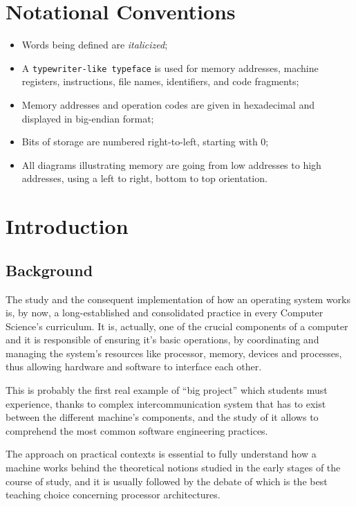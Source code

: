 \documentclass[12pt,a4paper,openright,twoside]{report}
\begin{document}
\chapter*{Notational Conventions}
\begin{itemize}
	\item Words being defined are \textit{italicized};
	\item A \texttt{typewriter-like typeface} is used for memory addresses, machine registers, instructions, file names, identifiers, and code fragments;
	\item Memory addresses and operation codes are given in hexadecimal and displayed in big-endian format;
	\item Bits of storage are numbered right-to-left, starting with 0;
	\item All diagrams illustrating memory are going from low addresses to high addresses, using a left to right, bottom to top orientation.
\end{itemize}

\clearpage{\pagestyle{empty}\cleardoublepage}
\chapter{Introduction}
\lhead[\fancyplain{}{\bfseries\thepage}]{\fancyplain{}{\bfseries\rightmark}}

\section{Background}
The study and the consequent implementation of how an operating system works is, by now, a long-established and consolidated practice in every Computer Science's curriculum.
It is, actually, one of the crucial components of a computer and it is responsible of ensuring it's basic operations, by coordinating and managing the system's resources like processor, memory, devices and processes, thus allowing hardware and software to interface each other.

This is probably the first real example of ``big project'' which students must experience, thanks to complex intercommunication system that has to exist between the different machine's components, and the study of it allows to comprehend the most common software engineering practices.

The approach on practical contexts is essential to fully understand how a machine works behind the theoretical notions studied in the early stages of the course of study, and it is usually followed by the debate of which is the best teaching choice concerning processor architectures.
\end{document}
